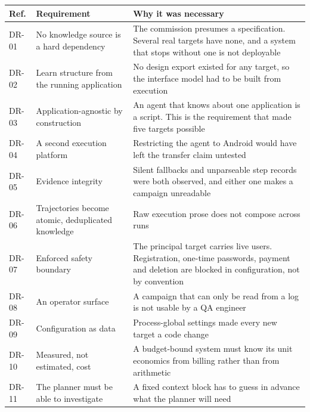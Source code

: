 \begin{table}[H]
  \centering\small
  \begin{tabularx}{\textwidth}{@{}>{\hsize}Y>{\hsize}Y>{\hsize}Y@{}}
    \toprule
    Ref. & Requirement & Why it was necessary \\
    \midrule
    DR-01 & No knowledge source is a hard dependency & The commission presumes a specification. Several real targets have none, and a system that stops without one is not deployable \\
    \addlinespace
    DR-02 & Learn structure from the running application & No design export existed for any target, so the interface model had to be built from execution \\
    \addlinespace
    DR-03 & Application-agnostic by construction & An agent that knows about one application is a script. This is the requirement that made five targets possible \\
    \addlinespace
    DR-04 & A second execution platform & Restricting the agent to Android would have left the transfer claim untested \\
    \addlinespace
    DR-05 & Evidence integrity & Silent fallbacks and unparseable step records were both observed, and either one makes a campaign unreadable \\
    \addlinespace
    DR-06 & Trajectories become atomic, deduplicated knowledge & Raw execution prose does not compose across runs \\
    \addlinespace
    DR-07 & Enforced safety boundary & The principal target carries live users. Registration, one-time passwords, payment and deletion are blocked in configuration, not by convention \\
    \addlinespace
    DR-08 & An operator surface & A campaign that can only be read from a log is not usable by a QA engineer \\
    \addlinespace
    DR-09 & Configuration as data & Process-global settings made every new target a code change \\
    \addlinespace
    DR-10 & Measured, not estimated, cost & A budget-bound system must know its unit economics from billing rather than from arithmetic \\
    \addlinespace
    DR-11 & The planner must be able to investigate & A fixed context block has to guess in advance what the planner will need \\
    \bottomrule
  \end{tabularx}
\end{table}

